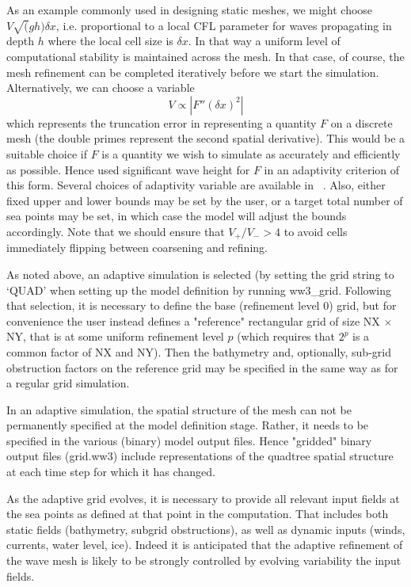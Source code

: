 As an example commonly used in designing static meshes, we might choose 
$V\sqrt(gh) \delta x$, i.e. proportional to a local CFL parameter for 
waves propagating in depth $h$ where the local cell size is $\delta x$.
In that way a uniform level of computational stability is maintained across 
the mesh. 
In that case, of course, the mesh refinement can be completed iteratively 
before we start the simulation. Alternatively, we can choose a variable 
$$V \propto |F''(\delta x)^2| $$
which represents the truncation error in representing a quantity $F$ on a
discrete mesh (the double primes represent the second spatial derivative). 
This would be a suitable choice if $F$ is a quantity we wish to simulate 
as accurately and efficiently as possible. Hence \citep{art:PGRT10xx} 
used significant wave height for $F$ in an adaptivity criterion of this form.
Several choices of adaptivity variable are available in \ws\ . 
Also, either fixed upper and lower bounds may be set by the user, or a 
target total number of sea points may be set, in which case the model 
will adjust the bounds accordingly. 
Note that we should ensure that $V_+/V_- > 4$ to avoid cells
immediately flipping between coarsening and refining.  

As noted above, an adaptive simulation is selected (by setting the grid string 
to `{\code QUAD}' when setting up the model definition by running 
{\code ww3\_grid}. Following that selection, it is necessary to define the 
base (refinement level 0) grid, but for convenience the user instead defines a 
"reference" rectangular grid of size {\code NX} $\times$ {\code NY}, that is 
at some uniform refinement level $p$ (which requires that $2^p$ is a common 
factor of {\code NX} and {\code NY}). Then the bathymetry and, optionally, 
sub-grid obstruction factors on the reference grid may be specified in the 
same way as for a regular grid simulation.

In an adaptive simulation, the spatial structure of the mesh can not be
permanently specified at the model definition stage. 
Rather, it needs to be specified in the various (binary) model output files. 
Hence "gridded" binary output files (grid.ww3) include
representations of the quadtree spatial structure at each time step for
which it has changed. 

As the adaptive grid evolves, it is necessary to provide all relevant input 
fields at the sea points as defined at that point in the computation. That 
includes both static fields (bathymetry, subgrid obstructions), as well
as dynamic inputs (winds, currents, water level, ice). Indeed it is 
anticipated that the adaptive refinement of the wave mesh is likely to 
be strongly controlled by evolving variability the input fields.

